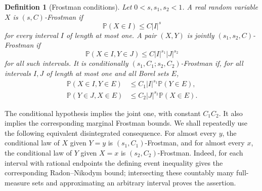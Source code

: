 \documentclass[11pt]{article}
\newtheorem{definition}[theorem]{Definition}
\begin{document}
\begin{definition}[Frostman conditions]
Let \(0<s,s_1,s_2<1\).  A real random variable \(X\) is
\((s,C)\)-Frostman if
\[
 \mathbb P(X\in I)\le C|I|^s
\]
for every interval \(I\) of length at most one.  A pair \((X,Y)\) is
jointly \((s_1,s_2,C)\)-Frostman if
\[
 \mathbb P(X\in I,Y\in J)
 \le C|I|^{s_1}|J|^{s_2}
\]
for all such intervals.  It is conditionally
\((s_1,C_1;s_2,C_2)\)-Frostman if, for all intervals \(I,J\) of
length at most one and all Borel sets \(E\),
\begin{align*}
 \mathbb P(X\in I,Y\in E)&\le C_1|I|^{s_1}\mathbb P(Y\in E),\\
 \mathbb P(Y\in J,X\in E)&\le C_2|J|^{s_2}\mathbb P(X\in E).
\end{align*}
\end{definition}

The conditional hypothesis implies the joint one, with constant
\(C_1C_2\).  It also implies the corresponding marginal Frostman
bounds.  We shall repeatedly use the following equivalent
disintegrated consequence.  For almost every \(y\), the conditional
law of \(X\) given \(Y=y\) is \((s_1,C_1)\)-Frostman, and for almost
every \(x\), the conditional law of \(Y\) given \(X=x\) is
\((s_2,C_2)\)-Frostman.  Indeed, for each interval with rational
endpoints the defining event inequality gives the corresponding
Radon--Nikodym bound; intersecting these countably many full-measure
sets and approximating an arbitrary interval proves the assertion.

\medskip
{}
\end{document}
